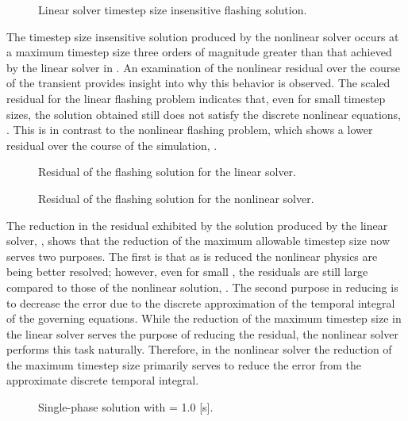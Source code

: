 \begin{figure}[h!t]
\centering

\caption{Linear solver timestep size insensitive flashing solution.}
\label{fig:flashingDtInsensitiveLin}
\end{figure}

The timestep size insensitive solution produced by the nonlinear solver occurs at a maximum timestep size three orders of magnitude greater than that achieved by the linear solver in \cobra{}.
An examination of the nonlinear residual over the course of the transient provides insight into why this behavior is observed.
The scaled residual for the linear flashing problem indicates that, even for small timestep sizes, the solution obtained still does not satisfy the discrete nonlinear equations, .
This is in contrast to the nonlinear flashing problem, which shows a lower residual over the course of the simulation, .

\begin{figure}[h!t]
\centering

\caption{Residual of the flashing solution for the linear solver.}
\label{fig:flashingResidualLin}
\end{figure}


\begin{figure}[h!t]
\centering

\caption{Residual of the flashing solution for the nonlinear solver.}
\label{fig:flashingResidualNln}
\end{figure}

The reduction in the residual exhibited by the solution produced by the linear solver, , shows that the reduction of the maximum allowable timestep size now serves two purposes.
The first is that as \dtmax{} is reduced the nonlinear physics are being better resolved; however, even for small \dtmax{}, the residuals are still large compared to those of the nonlinear solution, .
The second purpose in reducing \dtmax{} is to decrease the error due to the discrete approximation of the temporal integral of the governing equations.
While the reduction of the maximum timestep size in the linear solver serves the purpose of reducing the residual, the nonlinear solver performs this task naturally.
Therefore, in the nonlinear solver the reduction of the maximum timestep size primarily serves to reduce the error from the approximate discrete temporal integral.

\begin{figure}[h!t]
\centering

\caption{Single-phase solution with \dtmax{} = 1.0 {[s]}.}
\label{fig:single1pt000em0}
\end{figure}

